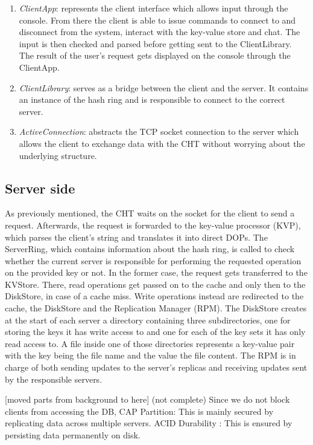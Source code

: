 \begin{enumerate} 
  \item \textit{ClientApp}: represents the client interface which allows input through the console. From there the client is able to issue commands to connect to and disconnect from the system, interact with the key-value store and chat. The input is then checked and parsed before getting sent to the ClientLibrary. The result of the user's request gets displayed on the console through the ClientApp.
  \item \textit{ClientLibrary}: serves as a bridge between the client and the server. It contains an instance of the hash ring and is responsible to connect to the correct server.
  \item \textit{ActiveConnection}: abstracts the TCP socket connection to the server which allows the client to exchange data with the CHT without worrying about the underlying structure.
\end{enumerate}
 
\subsection{Server side}

As previously mentioned, the CHT waits on the socket for the client to send a request. Afterwards, the request is forwarded to the key-value processor (KVP), which parses the client's string and translates it into direct DOPs. The ServerRing, which contains information about the hash ring, is called to check whether the current server is responsible for performing the requested operation on the provided key or not. In the former case, the request gets transferred to the KVStore. There, read operations get passed on to the cache and only then to the DiskStore, in case of a cache miss. Write operations instead are redirected to the cache, the DiskStore and the Replication Manager (RPM). The DiskStore creates at the start of each server a directory containing three subdirectories, one for storing the keys it has write access to and one for each of the key sets it has only read access to. A file inside one of those directories represents a key-value pair with the key being the file name and the value the file content.
The RPM is in charge of both sending updates to the server's replicas and receiving updates sent by the responsible servers.

[moved parts from background to here] (not complete)
Since we do not block clients from accessing the DB, 
CAP Partition: This is mainly secured by replicating data across multiple servers.
ACID Durability : This is ensured by persisting data permanently on disk.

